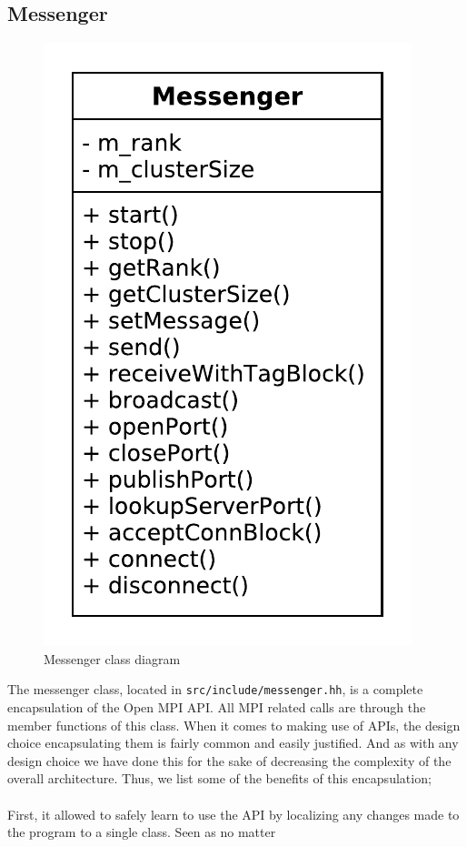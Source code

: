 \documentclass[11pt]{article}
\begin{document}
\subsection{Messenger}
\begin{figure}[H]
  \centering
  \includegraphics[scale=0.5]{image/messenger.pdf}
  \caption{Messenger class diagram}
\end{figure}
The messenger class, located in \texttt{src/include/messenger.hh}, is a complete
encapsulation of the Open MPI API. All MPI related calls are through the member
functions of this class. When it comes to making use of APIs, the design choice
encapsulating them is fairly common and easily justified. And as with any
design choice we have done this for the sake of decreasing the complexity of the
overall architecture. Thus, we list some of the benefits of this
encapsulation;\\\\First, it allowed to safely learn to use the API by
localizing any changes made to the program to a single class. Seen as no matter
\end{document}
